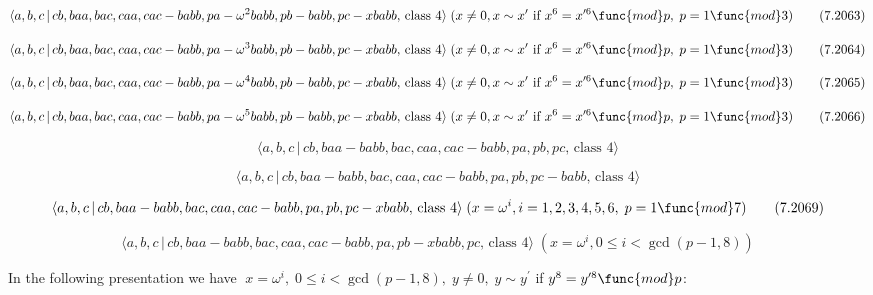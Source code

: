 \documentclass[10pt]{article}
\begin{document}
\begin{equation}
\langle a,b,c\,|\,cb,baa,bac,caa,cac-babb,pa-\omega
^{2}babb,pb-babb,pc-xbabb,\,\text{class }4\rangle \;(x\neq 0,x\sim x^{\prime}%
\text{ if }x^6 =x^{\prime 6}\func{mod}p,\;p=1\func{mod}3)  \tag{7.2063}
\end{equation}

\begin{equation}
\langle a,b,c\,|\,cb,baa,bac,caa,cac-babb,pa-\omega
^{3}babb,pb-babb,pc-xbabb,\,\text{class }4\rangle \;(x\neq 0,x\sim x^{\prime}%
\text{ if }x^6 =x^{\prime 6}\func{mod}p,\;p=1\func{mod}3)  \tag{7.2064}
\end{equation}

\begin{equation}
\langle a,b,c\,|\,cb,baa,bac,caa,cac-babb,pa-\omega
^{4}babb,pb-babb,pc-xbabb,\,\text{class }4\rangle \;(x\neq 0,x\sim x^{\prime}%
\text{ if }x^6 =x^{\prime 6}\func{mod}p,\;p=1\func{mod}3)  \tag{7.2065}
\end{equation}

\begin{equation}
\langle a,b,c\,|\,cb,baa,bac,caa,cac-babb,pa-\omega
^{5}babb,pb-babb,pc-xbabb,\,\text{class }4\rangle \;(x\neq 0,x\sim x^{\prime}%
\text{ if }x^6 =x^{\prime 6}\func{mod}p,\;p=1\func{mod}3)  \tag{7.2066}
\end{equation}

\begin{equation}
\langle a,b,c\,|\,cb,baa-babb,bac,caa,cac-babb,pa,pb,pc,\,\text{class }%
4\rangle  \tag{7.2067}
\end{equation}

\begin{equation}
\langle a,b,c\,|\,cb,baa-babb,bac,caa,cac-babb,pa,pb,pc-babb,\,\text{class }%
4\rangle  \tag{7.2068}
\end{equation}

\begin{equation}
\langle a,b,c\,|\,cb,baa-babb,bac,caa,cac-babb,pa,pb,pc-xbabb,\,\text{class }%
4\rangle \;(x=\omega ^{i},i=1,2,3,4,5,6,\;p=1\func{mod}7)  \tag{7.2069}
\end{equation}

\begin{equation}
\langle a,b,c\,|\,cb,baa-babb,bac,caa,cac-babb,pa,pb-xbabb,pc,\,\text{class }%
4\rangle \;(x=\omega ^{i},0\leq i<\gcd (p-1,8))  \tag{7.2070}
\end{equation}

In the following presentation we have $\;x=\omega ^{i},\;0\leq i<\gcd
(p-1,8),\;y\neq 0,\;y\sim y^{\prime }$ if $y^{8}=y^{\prime 8}\func{mod}p$:
\end{document}
